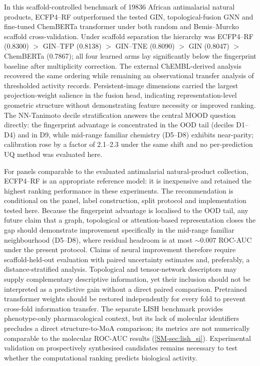\documentclass[11pt,a4paper]{article}
\begin{document}
In this scaffold-controlled benchmark of \num{19836} African antimalarial natural products, ECFP4--RF outperformed the tested GIN, topological-fusion GNN and fine-tuned ChemBERTa transformer under both random and Bemis--Murcko scaffold cross-validation. Under scaffold separation the hierarchy was ECFP4--RF (\num{0.8300}) $>$ GIN--TFP (\num{0.8138}) $>$ GIN--TNE (\num{0.8090}) $>$ GIN (\num{0.8047}) $>$ ChemBERTa (\num{0.7867}); all four learned arms lay significantly below the fingerprint baseline after multiplicity correction. The external ChEMBL-derived analysis recovered the same ordering while remaining an observational transfer analysis of thresholded activity records. Persistent-image dimensions carried the largest projection-weight salience in the fusion head, indicating representation-level geometric structure without demonstrating feature necessity or improved ranking. The NN-Tanimoto decile stratification answers the central MOOD question directly: the fingerprint advantage is concentrated in the OOD tail (deciles D\num{1}--D\num{4}) and in D\num{9}, while mid-range familiar chemistry (D\num{5}--D\num{8}) exhibits near-parity; calibration rose by a factor of \numrange{2.1}{2.3} under the same shift and no per-prediction UQ method was evaluated here.

For panels comparable to the evaluated antimalarial natural-product collection, ECFP4--RF is an appropriate reference model: it is inexpensive and retained the highest ranking performance in these experiments. The recommendation is conditional on the panel, label construction, split protocol and implementation tested here. Because the fingerprint advantage is localised to the OOD tail, any future claim that a graph, topological or attention-based representation closes the gap should demonstrate improvement specifically in the mid-range familiar neighbourhood (D\num{5}--D\num{8}), where residual headroom is at most $\sim\num{0.007}$ ROC-AUC under the present protocol. Claims of neural improvement therefore require scaffold-held-out evaluation with paired uncertainty estimates and, preferably, a distance-stratified analysis. Topological and tensor-network descriptors may supply complementary descriptive information, yet their inclusion should not be interpreted as a predictive gain without a direct paired comparison. Pretrained transformer weights should be restored independently for every fold to prevent cross-fold information transfer. The separate LISH benchmark provides phenotype-only pharmacological context, but its lack of molecular identifiers precludes a direct structure-to-MoA comparison; its metrics are not numerically comparable to the molecular ROC-AUC results (\cref{SM-sec:lish_si}). Experimental validation on prospectively synthesised candidates remains necessary to test whether the computational ranking predicts biological activity.
\end{document}
